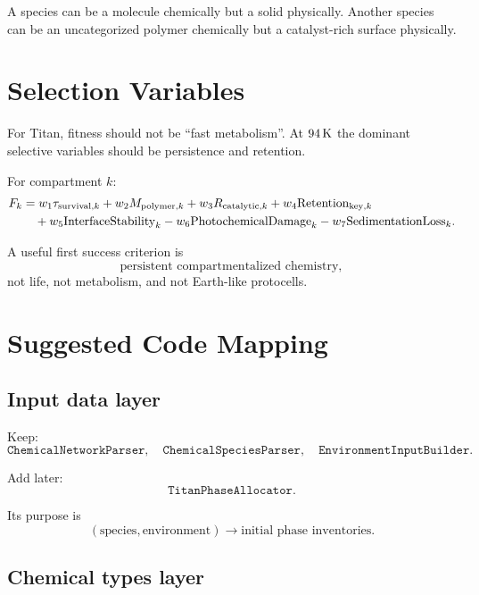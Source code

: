 \documentclass[11pt]{article}
\begin{document}
A species can be a molecule chemically but a solid physically. Another species can be an uncategorized polymer chemically but a catalyst-rich surface physically.

\section{Selection Variables}

For Titan, fitness should not be ``fast metabolism''. At $94\,{\rm K}$ the dominant selective variables should be persistence and retention.

For compartment $k$:
\begin{align}
F_k
&=
w_1\tau_{{\rm survival},k}
+w_2M_{{\rm polymer},k}
+w_3R_{{\rm catalytic},k}
+w_4{\rm Retention}_{{\rm key},k}
\nonumber\\
&\quad
+w_5{\rm InterfaceStability}_k
-w_6{\rm PhotochemicalDamage}_k
-w_7{\rm SedimentationLoss}_k.
\end{align}

A useful first success criterion is
\begin{equation}
\text{persistent compartmentalized chemistry},
\end{equation}
not life, not metabolism, and not Earth-like protocells.

\section{Suggested Code Mapping}

\subsection{Input data layer}

Keep:
\begin{equation}
\texttt{ChemicalNetworkParser},\quad
\texttt{ChemicalSpeciesParser},\quad
\texttt{EnvironmentInputBuilder}.
\end{equation}

Add later:
\begin{equation}
\texttt{TitanPhaseAllocator}.
\end{equation}

Its purpose is
\begin{equation}
(\text{species},\text{environment})
\rightarrow
\text{initial phase inventories}.
\end{equation}

\subsection{Chemical types layer}
\end{document}
